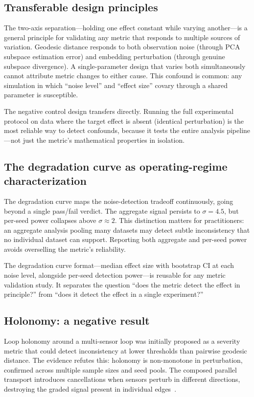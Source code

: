 \documentclass[11pt]{article}
\begin{document}
\subsection{Transferable design principles}

The two-axis separation---holding one effect constant while varying
another---is a general principle for validating any metric that
responds to multiple sources of variation.  Geodesic distance
responds to both observation noise (through PCA subspace
estimation error) and embedding perturbation (through genuine
subspace divergence).  A single-parameter design that varies both
simultaneously cannot attribute metric changes to either cause.
This confound is common: any simulation in which ``noise
level'' and ``effect size'' covary through a shared parameter is
susceptible.

The negative control design transfers directly.  Running the full
experimental protocol on data where the target effect is absent
(identical perturbation) is the most reliable way to detect
confounds, because it tests the entire analysis pipeline---not
just the metric's mathematical properties in isolation.

\subsection{The degradation curve as operating-regime
  characterization}

The degradation curve maps the noise-detection tradeoff
continuously, going beyond a single pass/fail verdict.  The
aggregate signal persists to $\sigma = 4.5$, but per-seed power
collapses above $\sigma \approx 2$.  This distinction matters for
practitioners: an aggregate analysis pooling many datasets may
detect subtle inconsistency that no individual dataset can support.
Reporting both aggregate and per-seed power avoids overselling
the metric's reliability.

The degradation curve format---median effect size with bootstrap CI
at each noise level, alongside per-seed detection power---is
reusable for any metric validation study.  It separates the
question ``does the metric detect the effect in principle?'' from
``does it detect the effect in a single experiment?''

\subsection{Holonomy: a negative result}

Loop holonomy around a multi-sensor loop was initially proposed as
a severity metric that could detect inconsistency at lower
thresholds than pairwise geodesic distance.  The evidence refutes
this: holonomy is non-monotone in perturbation, confirmed across
multiple sample sizes and seed pools.  The composed parallel
transport introduces cancellations when sensors perturb in
different directions, destroying the graded signal present in
individual edges~\citep{absil2008optimization}.
\end{document}
